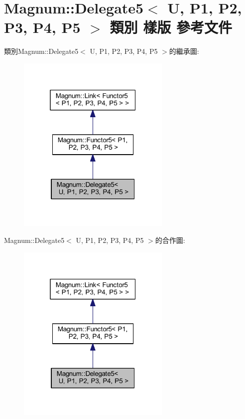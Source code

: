 \hypertarget{class_magnum_1_1_delegate5}{}\section{Magnum\+:\+:Delegate5$<$ U, P1, P2, P3, P4, P5 $>$ 類別 樣版 參考文件}
\label{class_magnum_1_1_delegate5}


類別\+Magnum\+:\+:Delegate5$<$ U, P1, P2, P3, P4, P5 $>$的繼承圖\+:\nopagebreak
\begin{figure}[H]
\begin{center}
\leavevmode
\includegraphics[width=208pt]{class_magnum_1_1_delegate5__inherit__graph}
\end{center}
\end{figure}


Magnum\+:\+:Delegate5$<$ U, P1, P2, P3, P4, P5 $>$的合作圖\+:\nopagebreak
\begin{figure}[H]
\begin{center}
\leavevmode
\includegraphics[width=208pt]{class_magnum_1_1_delegate5__coll__graph}
\end{center}
\end{figure}
